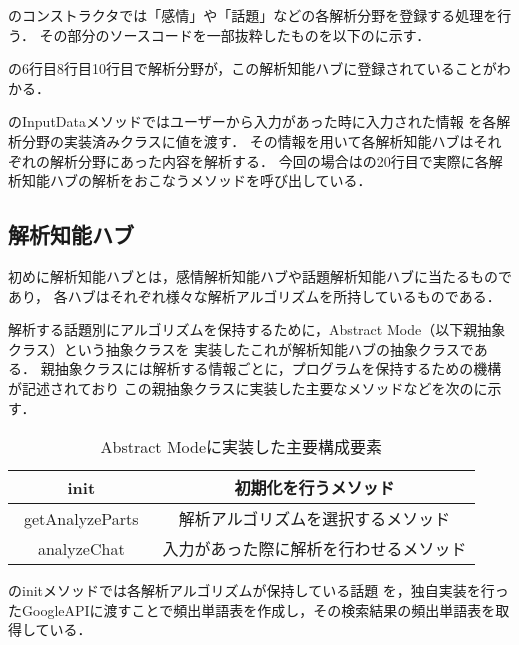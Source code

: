 のコンストラクタでは「感情」や「話題」などの各解析分野を登録する処理を行う．
その部分のソースコードを一部抜粋したものを以下のに示す．


の6行目8行目10行目で解析分野が，この解析知能ハブに登録されていることがわかる．

のInputDataメソッドではユーザーから入力があった時に入力された情報
を各解析分野の実装済みクラスに値を渡す．
その情報を用いて各解析知能ハブはそれぞれの解析分野にあった内容を解析する．
今回の場合はの20行目で実際に各解析知能ハブの解析をおこなうメソッドを呼び出している．

\subsection{解析知能ハブ}
初めに解析知能ハブとは，感情解析知能ハブや話題解析知能ハブに当たるものであり，
各ハブはそれぞれ様々な解析アルゴリズムを所持しているものである．

解析する話題別にアルゴリズムを保持するために，Abstract Mode（以下親抽象クラス）という抽象クラスを
実装したこれが解析知能ハブの抽象クラスである．
親抽象クラスには解析する情報ごとに，プログラムを保持するための機構が記述されており
この親抽象クラスに実装した主要なメソッドなどを次のに示す．

\begin{table}[tbh]
	\caption{Abstract Modeに実装した主要構成要素} \label{tab:Abstract Mode}
	\begin{center}
		\begin{tabular}[htb]{c|c}
		\hline
		init & 初期化を行うメソッド \\ \hline
		getAnalyzeParts　& 解析アルゴリズムを選択するメソッド \\ \hline
		analyzeChat & 入力があった際に解析を行わせるメソッド \\ \hline
		\end{tabular}
	\end{center}
\end{table}


のinitメソッドでは各解析アルゴリズムが保持している話題
を，独自実装を行ったGoogleAPIに渡すことで頻出単語表を作成し，その検索結果の頻出単語表を取得している．

